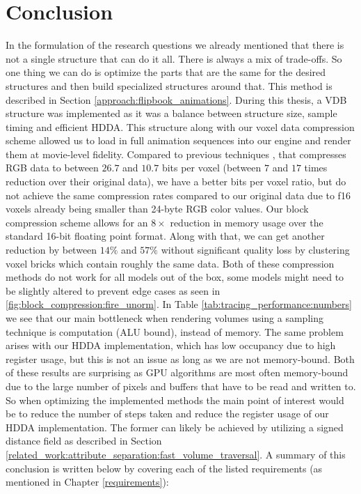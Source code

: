 \section{Conclusion} \label{conclusion}
In the formulation of the research questions we already mentioned that there is not a single structure that can do it all. There is always a mix of trade-offs. So one thing we can do is optimize the parts that are the same for the desired structures and then build specialized structures around that. This method is described in Section \ref{approach:flipbook_animations}. During this thesis, a VDB structure was implemented as it was a balance between structure size, sample timing and efficient HDDA. This structure along with our voxel data compression scheme allowed us to load in full animation sequences into our engine and render them at movie-level fidelity. Compared to previous techniques \cite{dolonius2017compressing}, that compresses RGB data to between $26.7$ and $10.7$ bits per voxel (between $7$ and $17$ times reduction over their original data), we have a better bits per voxel ratio, but do not achieve the same compression rates compared to our original data due to f16 voxels already being smaller than 24-byte RGB color values. Our block compression scheme allows for an $8\times$ reduction in memory usage over the standard 16-bit floating point format. Along with that, we can get another reduction by between $14\%$ and $57\%$ without significant quality loss by clustering voxel bricks which contain roughly the same data. Both of these compression methods do not work for all models out of the box, some models might need to be slightly altered to prevent edge cases as seen in \ref{fig:block_compression:fire_unorm}. In Table \ref{tab:tracing_performance:numbers} we see that our main bottleneck when rendering volumes using a sampling technique is computation (ALU bound), instead of memory. The same problem arises with our HDDA implementation, which has low occupancy due to high register usage, but this is not an issue as long as we are not memory-bound. Both of these results are surprising as GPU algorithms are most often memory-bound due to the large number of pixels and buffers that have to be read and written to. So when optimizing the implemented methods the main point of interest would be to reduce the number of steps taken and reduce the register usage of our HDDA implementation. The former can likely be achieved by utilizing a signed distance field as described in Section \ref{related_work:attribute_separation:fast_volume_traversal}. A summary of this conclusion is written below by covering each of the listed requirements (as mentioned in Chapter \ref{requirements}):

